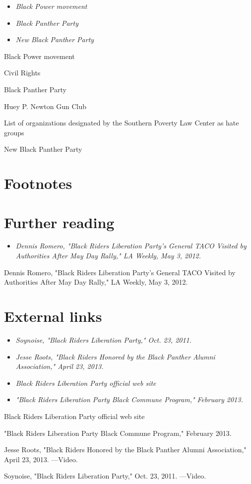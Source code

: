 \begin{itemize}
\item
  \emph{Black Power movement}
\item
  \emph{Black Panther Party}
\item
  \emph{New Black Panther Party}
\end{itemize}

Black Power movement

Civil Rights

Black Panther Party

Huey P. Newton Gun Club

List of organizations designated by the Southern Poverty Law Center as
hate groups

New Black Panther Party

\section{Footnotes}\label{footnotes}

\section{Further reading}\label{further-reading}

\begin{itemize}
\item
  \emph{Dennis Romero, "Black Riders Liberation Party's General TACO
  Visited by Authorities After May Day Rally," LA Weekly, May 3, 2012.}
\end{itemize}

Dennis Romero, "Black Riders Liberation Party's General TACO Visited by
Authorities After May Day Rally," LA Weekly, May 3, 2012.

\section{External links}\label{external-links}

\begin{itemize}
\item
  \emph{Soynoise, "Black Riders Liberation Party," Oct. 23, 2011.}
\item
  \emph{Jesse Roots, "Black Riders Honored by the Black Panther Alumni
  Association," April 23, 2013.}
\item
  \emph{Black Riders Liberation Party official web site}
\item
  \emph{"Black Riders Liberation Party Black Commune Program," February
  2013.}
\end{itemize}

Black Riders Liberation Party official web site

"Black Riders Liberation Party Black Commune Program," February 2013.

Jesse Roots, "Black Riders Honored by the Black Panther Alumni
Association," April 23, 2013. ---Video.

Soynoise, "Black Riders Liberation Party," Oct. 23, 2011. ---Video.
